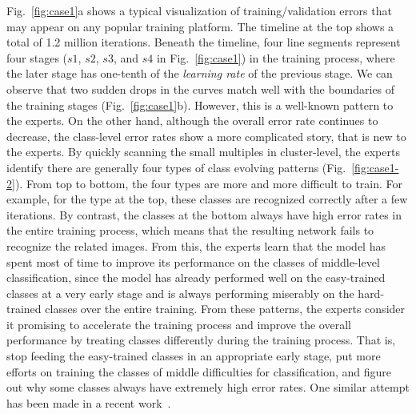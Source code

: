 \documentclass[format=acmsmall, review=false, screen=true]{acmart}
\newcommand{\ti}{\textcolor[rgb]{0,0,0}}
\newcommand{\dy}{\textcolor[rgb]{0,0,0}}
\begin{document}
Fig.~\ref{fig:case1}a shows a typical visualization of training/validation errors that may appear on any popular training platform. The timeline at the top shows a total of 1.2 million iterations.
Beneath the timeline, four line segments represent four stages ($s1$, $s2$, $s3$, and $s4$ in Fig.~\ref{fig:case1}) in the training process, \dy{where the later stage has one-tenth of the \textit{learning rate} of the previous stage.}%
We can observe that two sudden drops in the curves match well with the boundaries of the training stages (Fig.~\ref{fig:case1}b).
However, this is a well-known pattern to the experts.
On the other hand, although the overall error rate continues to decrease, the class-level error rates show a more complicated story, that is new to the experts.
By quickly scanning the small multiples in cluster-level, the experts identify there are generally four types of class evolving patterns (Fig.~\ref{fig:case1-2}).
From top to bottom, the four types are more and more difficult to train.
\ti{For example, for the type at the top, these classes are recognized correctly after a few iterations.
By contrast, the classes at the bottom always have high error rates in the entire training process, which means that the resulting network fails to recognize the related images.}
From this, the experts learn that the model has spent most of time to improve its performance on the classes of middle-level classification, since the model has already performed well on the easy-trained classes at a very early stage and is always performing miserably on the hard-trained classes over the entire training. 
From these patterns, the experts consider it promising to accelerate the training process and improve the overall performance by treating classes differently during the training process. That is, stop feeding the easy-trained classes in an appropriate early stage, put more efforts on training the classes of middle difficulties for classification, and figure out why some classes always have extremely high error rates. One similar attempt has been made in a recent work~\cite{lin2017focal}.
\end{document}
